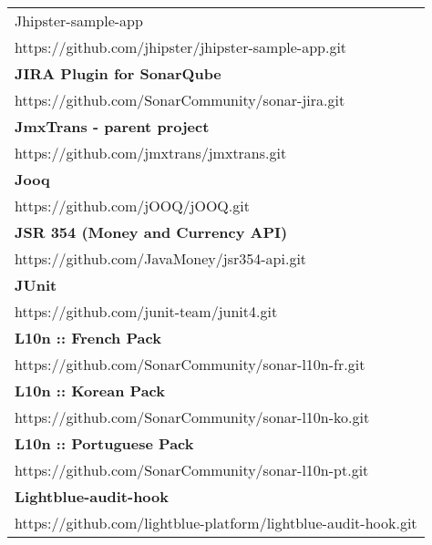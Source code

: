 \begin{table}[]
\begin{tabular}{|p{130mm}|}
Jhipster-sample-app                                \\ https://github.com/jhipster/jhipster-sample-app.git                          \\ \hline \bf
JIRA Plugin for SonarQube                          \\ https://github.com/SonarCommunity/sonar-jira.git                             \\ \hline \bf
JmxTrans - parent project                          \\ https://github.com/jmxtrans/jmxtrans.git                                     \\ \hline \bf
Jooq                                               \\ https://github.com/jOOQ/jOOQ.git                                             \\ \hline \bf
JSR 354 (Money and Currency API)                   \\ https://github.com/JavaMoney/jsr354-api.git                                  \\ \hline \bf
JUnit                                              \\ https://github.com/junit-team/junit4.git                                     \\ \hline \bf
L10n :: French Pack                                \\ https://github.com/SonarCommunity/sonar-l10n-fr.git                          \\ \hline \bf
L10n :: Korean Pack                                \\ https://github.com/SonarCommunity/sonar-l10n-ko.git                          \\ \hline \bf
L10n :: Portuguese Pack                            \\ https://github.com/SonarCommunity/sonar-l10n-pt.git                          \\ \hline \bf 
Lightblue-audit-hook                               \\ https://github.com/lightblue-platform/lightblue-audit-hook.git               \\ \hline

\end{tabular}
\end{table}

